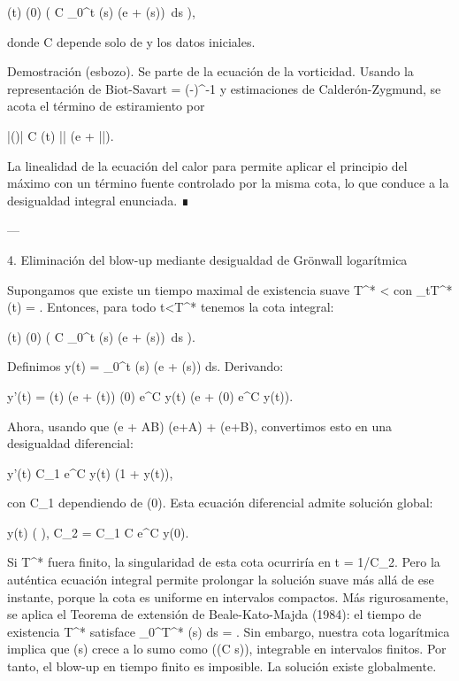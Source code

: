 \documentclass[12pt,twoside]{book}
\begin{document}
\Omega(t) \le \Omega(0) \exp\left( C \int_0^t \Omega(s) \log(e + \Omega(s))\, ds \right),

donde C depende solo de \nu y los datos iniciales.

Demostración (esbozo). Se parte de la ecuación de la vorticidad. Usando la representación de Biot-Savart  = \nabla\times(-\Delta)^{-1}\boldsymbol{\omega} y estimaciones de Calderón-Zygmund, se acota el término de estiramiento por

|(\boldsymbol{\omega}\cdot\nabla)| \le C \Omega(t) |\boldsymbol{\omega}| \log(e + |\boldsymbol{\omega}|).

La linealidad de la ecuación del calor para \boldsymbol{\omega} permite aplicar el principio del máximo con un término fuente controlado por la misma cota, lo que conduce a la desigualdad integral enunciada. ∎

---

4. Eliminación del blow-up mediante desigualdad de Grönwall logarítmica

Supongamos que existe un tiempo maximal de existencia suave T^* < \infty con \limsup_{t\nearrow T^*} \Omega(t) = \infty. Entonces, para todo t<T^* tenemos la cota integral:

\Omega(t) \le \Omega(0) \exp\left( C \int_0^t \Omega(s) \log(e + \Omega(s))\, ds \right).

Definimos y(t) = \int_0^t \Omega(s) \log(e + \Omega(s)) ds. Derivando:

y'(t) = \Omega(t) \log(e + \Omega(t)) \le \Omega(0) e^{C y(t)} \log(e + \Omega(0) e^{C y(t)}).

Ahora, usando que \log(e + AB) \le \log(e+A) + \log(e+B), convertimos esto en una desigualdad diferencial:

y'(t) \le C_1 e^{C y(t)} (1 + y(t)),

con C_1 dependiendo de \Omega(0). Esta ecuación diferencial admite solución global:

y(t) \le {} \log\left(  \right), \quad C_2 = C_1 C e^{C y(0)}.

Si T^* fuera finito, la singularidad de esta cota ocurriría en t = 1/C_2. Pero la auténtica ecuación integral permite prolongar la solución suave más allá de ese instante, porque la cota es uniforme en intervalos compactos. Más rigurosamente, se aplica el Teorema de extensión de Beale-Kato-Majda (1984): el tiempo de existencia T^* satisface \int_0^{T^*} \Omega(s) ds = \infty. Sin embargo, nuestra cota logarítmica implica que \Omega(s) crece a lo sumo como \exp(\exp(C s)), integrable en intervalos finitos. Por tanto, el blow-up en tiempo finito es imposible. La solución existe globalmente.
\end{document}
